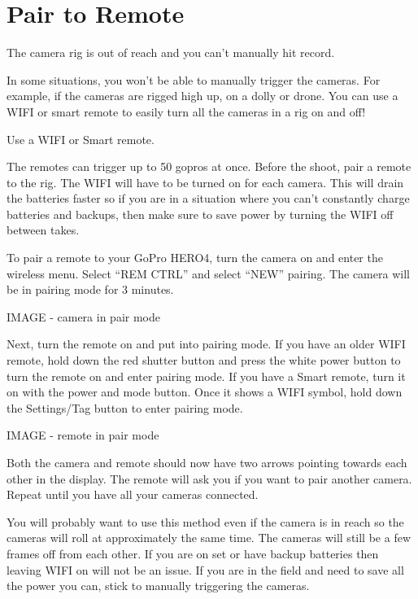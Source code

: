 \chapter{Pair to Remote}
\pagecolor{white}
\label{chap:09}
\begin{fullwidth}

\problem

{\large The camera rig is out of reach and you can’t manually hit record.  \par}

In some situations, you won’t be able to manually trigger the cameras. For example, if the cameras are rigged high up, on a dolly or drone. You can use a WIFI or smart remote to easily turn all the cameras in a rig on and off!  


\solution

{\large Use a WIFI or Smart remote. 
 \par}

The remotes can trigger up to 50 gopros at once. Before the shoot, pair a remote to the rig. The WIFI will have to be turned on for each camera. This will drain the batteries faster so if you are in a situation where you can’t constantly charge batteries and backups, then make sure to save power by turning the WIFI off between takes. 

To pair a remote to your GoPro HERO4, turn the camera on and enter the wireless menu. Select “REM CTRL” and select “NEW” pairing. The camera will be in pairing mode for 3 minutes.

IMAGE - camera in pair mode

Next, turn the remote on and put into pairing mode. If you have an older WIFI remote, hold down the red shutter button and press the white power button to turn the remote on and enter pairing mode. If you have a Smart remote, turn it on with the power and mode button. Once it shows a WIFI symbol, hold down the Settings/Tag button to enter pairing mode. 

IMAGE - remote in pair mode

Both the camera and remote should now have two arrows pointing towards each other in the display. The remote will ask you if you want to pair another camera. Repeat until you have all your cameras connected.

You will probably want to use this method even if the camera is in reach so the cameras will roll at approximately the same time. The cameras will still be a few frames off from each other.  If you are on set or have backup batteries then leaving WIFI on will not be an issue. If you are in the field and need to save all the power you can, stick to manually triggering the cameras. 




\clearpage
\end{fullwidth}
